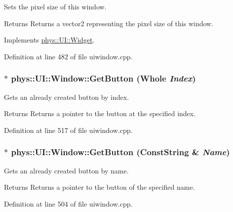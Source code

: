 Sets the pixel size of this window. 

\begin{DoxyReturn}{Returns}
Returns a vector2 representing the pixel size of this window. 
\end{DoxyReturn}


Implements \hyperlink{classphys_1_1UI_1_1Widget_af3a685621ed220748c0940ea38c96ed2}{phys::UI::Widget}.



Definition at line 482 of file uiwindow.cpp.

\hypertarget{classphys_1_1UI_1_1Window_aba0c70a91112b87383f83c86784ce7cd}{
\subsubsection[{GetButton}]{ $\ast$ phys::UI::Window::GetButton ({\bf Whole} {\em Index})}}
\label{d4/d86/classphys_1_1UI_1_1Window_aba0c70a91112b87383f83c86784ce7cd}


Gets an already created button by index. 

\begin{DoxyReturn}{Returns}
Returns a pointer to the button at the specified index. 
\end{DoxyReturn}


Definition at line 517 of file uiwindow.cpp.

\hypertarget{classphys_1_1UI_1_1Window_ab1152992cf6b636c8a4911889d930d9a}{
\subsubsection[{GetButton}]{ $\ast$ phys::UI::Window::GetButton ({\bf ConstString} \& {\em Name})}}
\label{d4/d86/classphys_1_1UI_1_1Window_ab1152992cf6b636c8a4911889d930d9a}


Gets an already created button by name. 

\begin{DoxyReturn}{Returns}
Returns a pointer to the button of the specified name. 
\end{DoxyReturn}


Definition at line 504 of file uiwindow.cpp.

